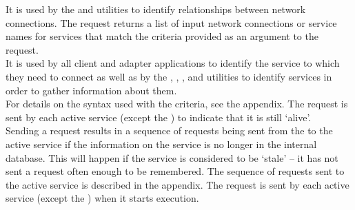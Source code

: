 It is used by the  and
 utilities to identify relationships
between \yarp{} network connections.
The  request returns a list of
input \yarp{} network connections or service names for services that match the criteria
provided as an argument to the request.\\

It is used by all client and adapter applications to identify the service to which they
need to connect as well as by the ,
, ,
 and 
utilities to identify services in order to gather information about them.\\

For details on the syntax used with the criteria, see the 
 appendix.
The  request is sent by each
active service (except the ) to indicate
that it is still `alive'.\\

Sending a  request results in a
sequence of requests being sent from the 
to the active service if the information on the service is no longer in the internal
database.
This will happen if the service is considered to be `stale' -- it has not sent a
 request often enough to be
remembered.
The sequence of requests sent to the active service is described in the 
 appendix.
The  request is sent by each
active service (except the ) when it
starts execution.\\

